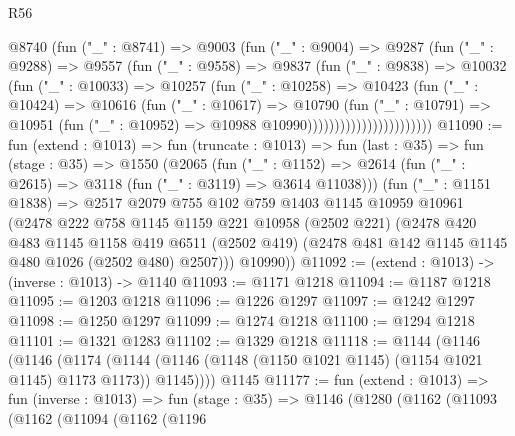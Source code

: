 \begin{lexlean}{R56}
\begin{coremodule}
                          @8740
                            (fun ("_" : @8741) =>
                            @9003
                              (fun ("_" : @9004) =>
                              @9287
                                (fun ("_" : @9288) =>
                                @9557
                                  (fun ("_" : @9558) =>
                                  @9837
                                    (fun ("_" : @9838) =>
                                    @10032
                                      (fun ("_" : @10033) =>
                                      @10257
                                        (fun ("_" : @10258) =>
                                        @10423
                                          (fun ("_" : @10424) =>
                                          @10616
                                            (fun ("_" : @10617) =>
                                            @10790
                                              (fun ("_" : @10791) =>
                                              @10951
                                                (fun ("_" : @10952) =>
                                                @10988 @10990)))))))))))))))))))))))
@11090 := fun (extend : @1013) =>
  fun (truncate : @1013) =>
  fun (last : @35) =>
  fun (stage : @35) =>
  @1550
    (@2065
      (fun ("_" : @1152) => @2614 (fun ("_" : @2615) => @3118 (fun ("_" : @3119) => @3614 @11038)))
      (fun ("_" : @1151 @1838) =>
      @2517
        @2079
        @755
        @102
        @759
        @1403
        @1145
        @10959
        @10961
        (@2478
          @222
          @758
          @1145
          @1159
          @221
          @10958
          (@2502 @221)
          (@2478
            @420
            @483
            @1145
            @1158
            @419
            @6511
            (@2502 @419)
            (@2478 @481 @142 @1145 @1145 @480 @1026 (@2502 @480) @2507)))
        @10990))
@11092 := (extend : @1013) -> (inverse : @1013) -> @1140
@11093 := @1171 @1218
@11094 := @1187 @1218
@11095 := @1203 @1218
@11096 := @1226 @1297
@11097 := @1242 @1297
@11098 := @1250 @1297
@11099 := @1274 @1218
@11100 := @1294 @1218
@11101 := @1321 @1283
@11102 := @1329 @1218
@11118 := @1144
    (@1146
      (@1146
        (@1174 (@1144 (@1146 (@1148 (@1150 @1021 @1145) (@1154 @1021 @1145) @1173 @1173)) @1145))))
    @1145
@11177 := fun (extend : @1013) =>
  fun (inverse : @1013) =>
  fun (stage : @35) =>
  @1146
    (@1280
      (@1162
        (@11093
          (@1162
            (@11094
              (@1162
                (@1196

\end{coremodule}
\end{lexlean}
